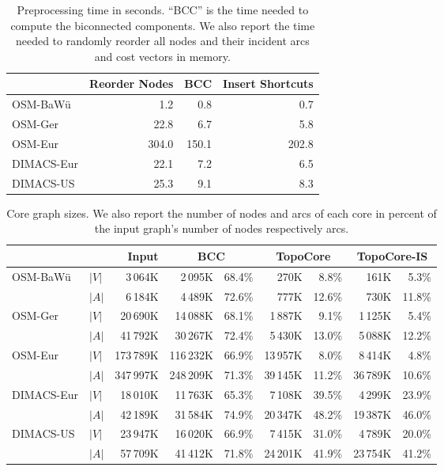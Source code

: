\documentclass{sig-alternate}
\begin{document}
\begin{table}
\caption{\label{tab:prepro}Preprocessing time in seconds. ``BCC'' is the
time needed to compute the biconnected components. We also report
the time needed to randomly reorder all nodes and their incident arcs
and cost vectors in memory. }
\begin{centering}
\begin{tabular}{lrrr}
\toprule
 & Reorder Nodes & BCC & Insert Shortcuts\tabularnewline
\midrule 
OSM-BaWü & 1.2 & 0.8 & 0.7\tabularnewline
OSM-Ger & 22.8 & 6.7 & 5.8\tabularnewline
OSM-Eur & 304.0 & 150.1 & 202.8\tabularnewline
DIMACS-Eur & 22.1 & 7.2 & 6.5\tabularnewline
DIMACS-US & 25.3 & 9.1 & 8.3\tabularnewline
\bottomrule
\end{tabular}
\par\end{centering}
\end{table}

\begin{table*}
\caption{\label{tab:core-size}Core graph sizes. We also report the number of nodes and arcs of each core in percent of the input graph's number of nodes respectively arcs.}
\begin{centering}
\begin{tabular}{llrrrrrrr}
\toprule
 &  & Input & \multicolumn{2}{c}{BCC} & \multicolumn{2}{c}{TopoCore} & \multicolumn{2}{c}{TopoCore-IS}\tabularnewline
\midrule
OSM-BaWü & $|V|$ & 3\,064K & 2\,095K & 68.4\% & 270K & 8.8\% & 161K & 5.3\%\tabularnewline
 & $|A|$ & 6\,184K & 4\,489K & 72.6\% & 777K & 12.6\% & 730K & 11.8\%\tabularnewline
 \addlinespace
OSM-Ger & $|V|$ & 20\,690K & 14\,088K & 68.1\% & 1\,887K & 9.1\% & 1\,125K & 5.4\%\tabularnewline
 & $|A|$ & 41\,792K & 30\,267K & 72.4\% & 5\,430K & 13.0\% & 5\,088K & 12.2\%\tabularnewline
 \addlinespace
OSM-Eur & $|V|$ & 173\,789K & 116\,232K & 66.9\% & 13\,957K & 8.0\% & 8\,414K & 4.8\%\tabularnewline
 & $|A|$ & 347\,997K & 248\,209K & 71.3\% & 39\,145K & 11.2\% & 36\,789K & 10.6\%\tabularnewline
 \addlinespace
DIMACS-Eur & $|V|$ & 18\,010K & 11\,763K & 65.3\% & 7\,108K & 39.5\% & 4\,299K & 23.9\%\tabularnewline
 & $|A|$ & 42\,189K & 31\,584K & 74.9\% & 20\,347K & 48.2\% & 19\,387K & 46.0\%\tabularnewline
 \addlinespace
DIMACS-US & $|V|$ & 23\,947K & 16\,020K & 66.9\% & 7\,415K & 31.0\% & 4\,789K & 20.0\%\tabularnewline
 & $|A|$ & 57\,709K & 41\,412K & 71.8\% & 24\,201K & 41.9\% & 23\,754K & 41.2\%\tabularnewline
 \bottomrule
\end{tabular}
\par\end{centering}
\end{table*}
\end{document}
